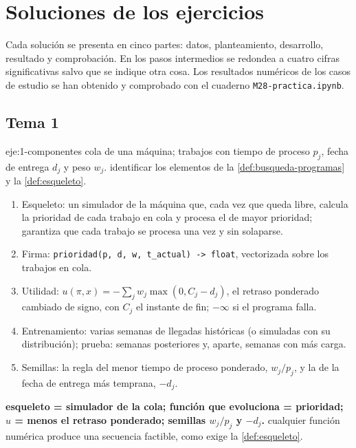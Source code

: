 \chapter{Soluciones de los ejercicios}
\label{ap:soluciones}

Cada solución se presenta en cinco partes: datos, planteamiento, desarrollo, resultado y comprobación. En los pasos intermedios se redondea a cuatro cifras significativas salvo que se indique otra cosa. Los resultados numéricos de los casos de estudio se han obtenido y comprobado con el cuaderno \texttt{M28-practica.ipynb}.

\section{Tema 1}

\begin{solucion}{eje:1-componentes}
\datos cola de una máquina; trabajos con tiempo de proceso $p_j$, fecha de entrega $d_j$ y peso $w_j$.
\planteamiento identificar los elementos de la \cref{def:busqueda-programas} y la \cref{def:esqueleto}.
\pasos
\begin{enumerate}[label=\arabic*.]
  \item Esqueleto: un simulador de la máquina que, cada vez que queda libre, calcula la prioridad de cada trabajo en cola y procesa el de mayor prioridad; garantiza que cada trabajo se procesa una vez y sin solaparse.
  \item Firma: \texttt{prioridad(p, d, w, t\_actual) -> float}, vectorizada sobre los trabajos en cola.
  \item Utilidad: $u(\pi,x)=-\sum_j w_j\max(0,C_j-d_j)$, el retraso ponderado cambiado de signo, con $C_j$ el instante de fin; $-\infty$ si el programa falla.
  \item Entrenamiento: varias semanas de llegadas históricas (o simuladas con su distribución); prueba: semanas posteriores y, aparte, semanas con más carga.
  \item Semillas: la regla del menor tiempo de proceso ponderado, $w_j/p_j$, y la de la fecha de entrega más temprana, $-d_j$.
\end{enumerate}
\resultado \textbf{esqueleto = simulador de la cola; función que evoluciona = prioridad; $u$ = menos el retraso ponderado; semillas $w_j/p_j$ y $-d_j$.}
\comprobacion cualquier función numérica produce una secuencia factible, como exige la \cref{def:esqueleto}.
\end{solucion}

